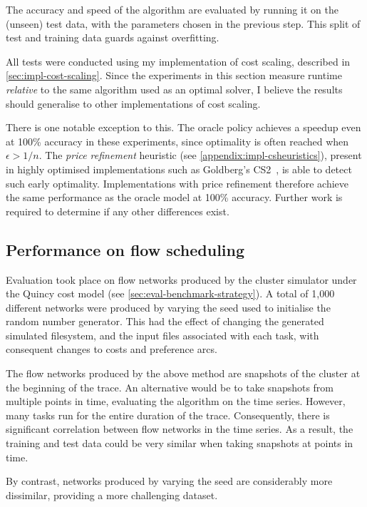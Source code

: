 The accuracy and speed of the algorithm are evaluated by running it on the (unseen) test data, with the parameters chosen in the previous step. This split of test and training data guards against overfitting.

All tests were conducted using my implementation of cost scaling, described in \cref{sec:impl-cost-scaling}. Since the experiments in this section measure runtime \emph{relative} to the same algorithm used as an optimal solver, I believe the results should generalise to other implementations of cost scaling. 

There is one notable exception to this. The oracle policy achieves a speedup even at 100\% accuracy in these experiments, since optimality is often reached when $\epsilon > 1/n$. The \emph{price refinement} heuristic (see \cref{appendix:impl-csheuristics}), present in highly optimised implementations such as Goldberg's CS2~\cite{CS2:2009}, is able to detect such early optimality. Implementations with price refinement therefore achieve the same performance as the oracle model at 100\% accuracy. Further work is required to determine if any other differences exist.

\subsection{Performance on flow scheduling} \label{sec:eval-approx-flow-scheduling}

Evaluation took place on flow networks produced by the cluster simulator under the Quincy cost model (see \cref{sec:eval-benchmark-strategy}). A total of 1,000 different networks were produced by varying the seed used to initialise the random number generator. This had the effect of changing the generated simulated filesystem, and the input files associated with each task, with consequent changes to costs and preference arcs.

The flow networks produced by the above method are snapshots of the cluster at the beginning of the trace. An alternative would be to take snapshots from multiple points in time, evaluating the algorithm on the time series. However, many tasks run for the entire duration of the trace. Consequently, there is significant correlation between flow networks in the time series. As a result, the training and test data could be very similar when taking snapshots at points in time. 

By contrast, networks produced by varying the seed are considerably more dissimilar, providing a more challenging dataset.

